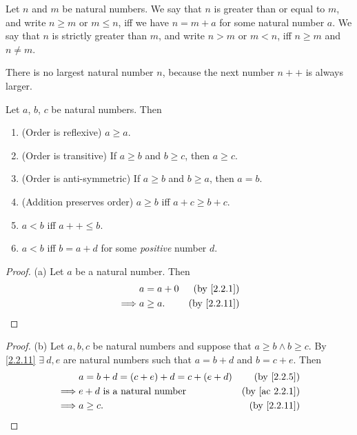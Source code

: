 \begin{definition}\label{2.2.11}
  Let \(n\) and \(m\) be natural numbers.
  We say that \(n\) is greater than or equal to \(m\), and write \(n \geq m\) or \(m \leq n\), iff we have \(n = m + a\) for some natural number \(a\).
  We say that \(n\) is strictly greater than \(m\), and write \(n > m\) or \(m < n\), iff \(n \geq m\) and \(n \neq m\).
\end{definition}

\begin{note}
  There is no largest natural number \(n\), because the next number \(n++\) is always larger.
\end{note}

\begin{proposition}\label{2.2.12}
  Let \(a\), \(b\), \(c\) be natural numbers.
  Then
  \begin{enumerate}
    \item (Order is reflexive) \(a \geq a\).
    \item (Order is transitive) If \(a \geq b\) and \(b \geq c\), then \(a \geq c\).
    \item (Order is anti-symmetric) If \(a \geq b\) and \(b \geq a\), then \(a = b\).
    \item (Addition preserves order) \(a \geq b\) iff \(a + c \geq b + c\).
    \item \(a < b\) iff \(a++ \leq b\).
    \item \(a < b\) iff \(b = a + d\) for some \emph{positive} number \(d\).
  \end{enumerate}
\end{proposition}

\begin{proof}{(a)}
  Let \(a\) be a natural number.
  Then
  \begin{align*}
             & a = a + 0 & \text{(by \cref{2.2.1})}  \\
    \implies & a \geq a. & \text{(by \cref{2.2.11})}
  \end{align*}
\end{proof}

\begin{proof}{(b)}
  Let \(a, b, c\) be natural numbers and suppose that \(a \geq b \land b \geq c\).
  By \cref{2.2.11} \(\exists\ d, e\) are natural numbers such that \(a = b + d\) and \(b = c + e\).
  Then
  \begin{align*}
             & a = b + d = (c + e) + d = c + (e + d) & \text{(by \cref{2.2.5})}    \\
    \implies & e + d \text{ is a natural number}     & \text{(by \cref{ac 2.2.1})} \\
    \implies & a \geq c.                             & \text{(by \cref{2.2.11})}   \\
  \end{align*}
\end{proof}


